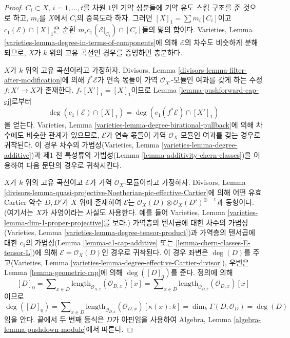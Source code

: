 \begin{proof}
$C_i \subset X$, $i = 1, \ldots, t$를 차원 $1$인 기약 성분들에
기약 유도 스킴 구조를 준 것으로 하고, $m_i$를 $X$에서 $C_i$의
중복도라 하자. 그러면 $[X]_1 = \sum m_i[C_i]$이고
$c_1(\mathcal{E}) \cap [X]_1$은 순환
$m_i c_1(\mathcal{E}|_{C_i}) \cap [C_i]$들의 밂의 합이다.
Varieties, Lemma
\ref{varieties-lemma-degree-in-terms-of-components}에 의해
$\mathcal{E}$의 차수도 비슷하게 분해되므로, $X$가 $k$ 위의 고유
곡선인 경우를 증명하면 충분하다.

\medskip\noindent
$X$가 $k$ 위의 고유 곡선이라고 가정하자. Divisors, Lemma
\ref{divisors-lemma-filter-after-modification}에 의해
$f^*\mathcal{E}$가 연속 몫들이 가역
$\mathcal{O}_{X'}$-모듈인 여과를 갖게 하는 수정
$f : X' \to X$가 존재한다. $f_*[X']_1 = [X]_1$이므로 Lemma
\ref{lemma-pushforward-cap-cj}로부터
$$
\deg(c_1(\mathcal{E}) \cap [X]_1) = \deg(c_1(f^*\mathcal{E}) \cap [X']_1)
$$
을 얻는다. Varieties, Lemma
\ref{varieties-lemma-degree-birational-pullback}에 의해 차수에도
비슷한 관계가 있으므로, $\mathcal{E}$가 연속 몫들이 가역
$\mathcal{O}_X$-모듈인 여과를 갖는 경우로 귀착된다. 이 경우 차수의
가법성(Varieties, Lemma \ref{varieties-lemma-degree-additive})과
제1 천 특성류의 가법성(Lemma
\ref{lemma-additivity-chern-classes})을 이용하여 다음 문단의
경우로 귀착시킨다.

\medskip\noindent
$X$가 $k$ 위의 고유 곡선이고 $\mathcal{E}$가 가역
$\mathcal{O}_X$-모듈이라고 가정하자. Divisors, Lemma
\ref{divisors-lemma-quasi-projective-Noetherian-pic-effective-Cartier}에
의해 어떤 유효 Cartier 약수 $D, D'$가 $X$ 위에 존재하여
$\mathcal{E}$는
$\mathcal{O}_X(D) \otimes \mathcal{O}_X(D')^{\otimes -1}$과 동형이다.
(여기서는 $X$가 사영이라는 사실도 사용한다. 예를 들어 Varieties,
Lemma \ref{varieties-lemma-dim-1-proper-projective}를 보라.)
가역층의 텐서곱에 대한 차수의 가법성(Varieties, Lemma
\ref{varieties-lemma-degree-tensor-product})과 가역층의 텐서곱에
대한 $c_1$의 가법성(Lemma \ref{lemma-c1-cap-additive} 또는
\ref{lemma-chern-classes-E-tensor-L})에 의해
$\mathcal{E} = \mathcal{O}_X(D)$인 경우로 귀착된다. 이 경우 좌변은
$\deg(D)$를 주고(Varieties, Lemma
\ref{varieties-lemma-degree-effective-Cartier-divisor}), 우변은
Lemma \ref{lemma-geometric-cap}에 의해 $\deg([D]_0)$를 준다.
정의에 의해
$$
[D]_0 = \sum\nolimits_{x \in D}
\text{length}_{\mathcal{O}_{X, x}}(\mathcal{O}_{D, x}) [x] =
\sum\nolimits_{x \in D}
\text{length}_{\mathcal{O}_{D, x}}(\mathcal{O}_{D, x}) [x]
$$
이므로
$$
\deg([D]_0) = \sum\nolimits_{x \in D}
\text{length}_{\mathcal{O}_{D, x}}(\mathcal{O}_{D, x}) [\kappa(x) : k] =
\dim_k \Gamma(D, \mathcal{O}_D) = \deg(D)
$$
임을 안다. 끝에서 두 번째 등식은 $D$가 아핀임을 사용하여
Algebra, Lemma \ref{algebra-lemma-pushdown-module}에서 따른다.
\end{proof}

